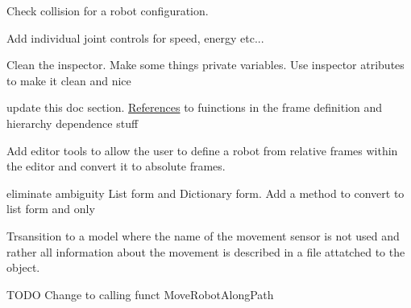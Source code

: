 \begin{DoxyRefList}
\label{todo__todo000009}%
%
Check collision for a robot configuration.  
\item[Class \mbox{\hyperlink{class_joint_class}{Joint\+Class}} ]\label{todo__todo000010}%
%
Add individual joint controls for speed, energy etc... 



Clean the inspector. Make some things private variables. Use inspector atributes to make it clean and nice

\label{todo__todo000011}%
%
update this doc section. \mbox{\hyperlink{class_references}{References}} to fuinctions in the frame definition and hierarchy dependence stuff

\label{todo__todo000012}%
%
Add editor tools to allow the user to define a robot from relative frames within the editor and convert it to absolute frames. 
\item[Class \mbox{\hyperlink{class_movement}{Movement}} ]\label{todo__todo000013}%
%
eliminate ambiguity List form and Dictionary form. Add a method to convert to list form and only  
\item[Member \mbox{\hyperlink{class_robot_script_aaaacc0eacd09c68f0e399dfb780c16a3}{Robot\+Script.Get\+Possible\+Movement\+Sensors}} ()]\label{todo__todo000014}%
%
Trsansition to a model where the name of the movement sensor is not used and rather all information about the movement is described in a file attatched to the object. ~\newline
  
\item[Member \mbox{\hyperlink{class_robot_script_a9213947f626c88acf4ce793020a9ef3d}{Robot\+Script.Move\+To\+Node}} (Game\+Object End\+Node)]\label{todo__todo000015}%
%
TODO Change to calling funct Move\+Robot\+Along\+Path 
\end{DoxyRefList}